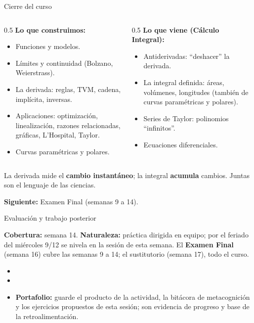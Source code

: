 \documentclass[10pt,aspectratio=169]{beamer}
\begin{document}
\begin{frame}{Cierre del curso}
  \begin{columns}[t]
    \begin{column}{0.5\textwidth}
      \textbf{Lo que construimos:}
      \begin{itemize}
        \item Funciones y modelos.
        \item Límites y continuidad (Bolzano, Weierstrass).
        \item La derivada: reglas, TVM, cadena, implícita, inversas.
        \item Aplicaciones: optimización, linealización, razones relacionadas, gráficas, L'Hospital, Taylor.
        \item Curvas paramétricas y polares.
      \end{itemize}
    \end{column}
    \begin{column}{0.5\textwidth}
      \textbf{Lo que viene (Cálculo Integral):}
      \begin{itemize}
        \item Antiderivadas: ``deshacer'' la derivada.
        \item La integral definida: áreas, volúmenes, longitudes (también de curvas paramétricas y polares).
        \item Series de Taylor: polinomios ``infinitos''.
        \item Ecuaciones diferenciales.
      \end{itemize}
    \end{column}
  \end{columns}
  \vspace{3mm}
  \begin{idea}
    La derivada mide el \textbf{cambio instantáneo}; la integral \textbf{acumula} cambios. Juntas son el lenguaje de las ciencias.
  \end{idea}
  \textbf{Siguiente:} Examen Final (semanas 9 a 14).
\end{frame}


\begin{frame}{Evaluación y trabajo posterior}
  \small
  \begin{evalbox}
    \textbf{Cobertura:} semana 14. \textbf{Naturaleza:} práctica dirigida en equipo; por el feriado del miércoles 9/12 se nivela en la sesión de esta semana. El \textbf{Examen Final} (semana 16) cubre las semanas 9 a 14; el sustitutorio (semana 17), todo el curso.
  \end{evalbox}
  \begin{itemize}
    \item \criterios
    \item \declaracionia
    \item \textbf{Portafolio:} guarde el producto de la actividad, la bitácora de metacognición y los ejercicios propuestos de esta sesión; son evidencia de progreso y base de la retroalimentación.
  \end{itemize}
\end{frame}
\end{document}
